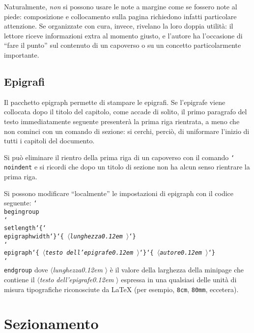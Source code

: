\documentclass{suftesi}
\DeclareRobustCommand*{\cs}[1]{\texttt{\char`\\#1}}
\DeclareRobustCommand*{\ar}[1]{\texttt{\char`\{#1\char`\}}}
\DeclareRobustCommand*{\meta}[1]{%
  $\langle${\normalfont\itshape#1\kern0.12em }$\rangle$}
\DeclareRobustCommand*{\arm}[1]{\ar{\meta{#1}}}
\newcommand{\pack}{\textsf}
\newenvironment{ttquote}
  {\genquote[\ttfamily\microtypesetup{activate=false}]}
  {\endgenquote}
\begin{document}
Naturalmente, \emph{non} si possono usare le note a margine come se
fossero note al piede: composizione e collocamento sulla pagina
richiedono infatti particolare attenzione. %
Se organizzate con cura, invece, rivelano la loro doppia
utilità: il lettore riceve informazioni extra al momento giusto, e
l'autore ha l'occasione di ``fare il punto'' sul contenuto di un
capoverso o su un concetto particolarmente importante.

\subsection{Epigrafi}

Il pacchetto \pack{epigraph} permette di stampare le epigrafi.  Se l'epigrafe viene collocata dopo il titolo del capitolo, come accade di solito, il primo paragrafo del
testo immediatamente seguente presenterà la prima riga rientrata, a
meno che non cominci con un comando di sezione: si cerchi, perciò, di
uniformare l'inizio di tutti i capitoli del documento. 

Si può eliminare il rientro della prima riga di un capoverso con il comando \cs{noindent} e si ricordi che dopo un titolo di sezione non ha alcun senso rientrare la prima riga.

Si possono modificare ``localmente'' le impostazioni di
\pack{epigraph} con il codice seguente:
\begin{ttquote}
\cs{begingroup}\\
\cs{setlength}\ar{\cs{epigraphwidth}}\arm{lunghezza}\\
\cs{epigraph}\arm{testo dell'epigrafe}\arm{autore}\\
\cs{endgroup}
\end{ttquote}
dove \meta{lunghezza} è il valore della larghezza della minipage che
contiene il \meta{testo dell'epigrafe} espressa in una qualsiasi delle unità di
misura tipografiche riconosciute da \LaTeX{} (per esempio,
\texttt{8cm}, \texttt{80mm}, eccetera).

\section{Sezionamento}
\end{document}
